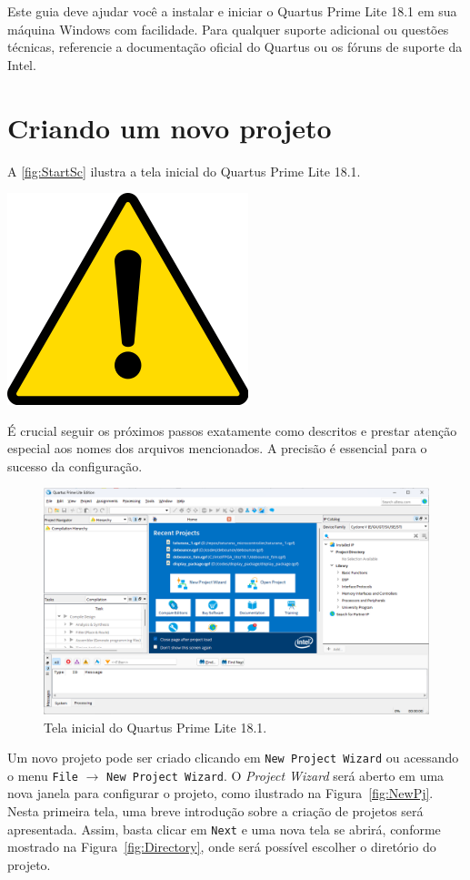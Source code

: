 \documentclass[12pt,a4paper]{article}
\newcommand{\Version}{18.1}
\newcommand{\Attention}[1]{
    \begin{tcolorbox}[colback=red!5!white, colframe=red!75!black]
        \noindent
        \begin{minipage}[c]{1cm}%
            \includegraphics[width=\linewidth]{figs/attention.png}
        \end{minipage}%
        \hfill%
        \begin{minipage}[c]{\dimexpr\linewidth-1cm-2mm}%
            \begin{center}
                #1    
            \end{center}            
        \end{minipage}
    \end{tcolorbox}
}
\begin{document}
Este guia deve ajudar você a instalar e iniciar o Quartus Prime Lite \Version{} em sua máquina Windows com facilidade. Para qualquer suporte adicional ou questões técnicas, referencie a documentação oficial do Quartus ou os fóruns de suporte da Intel.


\section{Criando um novo projeto}

A \autoref{fig:StartSc} ilustra a tela inicial do Quartus Prime Lite \Version.

\Attention{É crucial seguir os próximos passos exatamente como descritos e prestar atenção especial aos nomes dos arquivos mencionados. A precisão é essencial para o sucesso da configuração.}

\begin{figure}[htbp]
    \centering
    \includegraphics[width=\textwidth]{./figs/StartSc.png}
    \caption{Tela inicial do Quartus Prime Lite \Version.}
    \label{fig:StartSc}
\end{figure}

Um novo projeto pode ser criado clicando em \texttt{New Project Wizard} ou acessando o menu \texttt{File} $\rightarrow$ \texttt{New Project Wizard}. O \textit{Project Wizard} será aberto em uma nova janela para configurar o projeto, como ilustrado na Figura~\ref{fig:NewPj}. Nesta primeira tela, uma breve introdução sobre a criação de projetos será apresentada. Assim, basta clicar em \texttt{Next} e uma nova tela se abrirá, conforme mostrado na Figura~\ref{fig:Directory}, onde será possível escolher o diretório do projeto.
\end{document}
